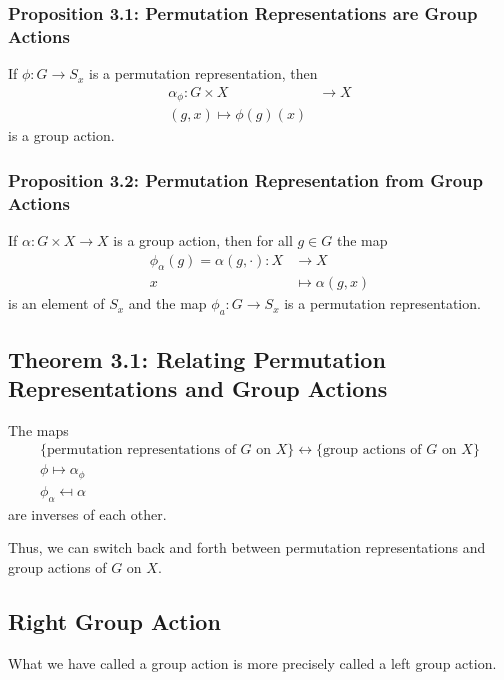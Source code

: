 \documentclass{article}
\begin{document}
\subsubsection{Proposition 3.1: Permutation Representations are Group Actions}
\begin{idea}
    If $\phi:G\rightarrow S_x$ is a permutation representation, then
    \begin{align*}
        \alpha_\phi:G\times X &\rightarrow X \\ 
        (g,x) \mapsto \phi(g)(x)
    \end{align*}
    is a group action.
\end{idea}
\subsubsection{Proposition 3.2: Permutation Representation from Group Actions}
\begin{idea}
    If $\alpha:G\times X \rightarrow X$ is a group action, then for all $g\in G$ the map
    \begin{align*}
        \phi_\alpha(g) = \alpha(g,\cdot): X&\rightarrow X \\
        x &\mapsto \alpha(g,x)
    \end{align*}
    is an element of $S_x$ and the map $\phi_a:G\rightarrow S_x$ is a permutation representation.
\end{idea}
\subsection{Theorem 3.1: Relating Permutation Representations and Group Actions}
\begin{idea}
    The maps 
    \begin{align*}
        \{\text{permutation representations of $G$ on $X$}\} \leftrightarrow \{\text{group actions of $G$ on $X$}\} \\ 
        \phi \mapsto \alpha_\phi \\ 
        \phi_\alpha \mapsfrom \alpha
    \end{align*}
    are inverses of each other.
\end{idea}
Thus, we can switch back and forth between permutation representations and group actions of $G$ on $X$.
\subsection{Right Group Action}
What we have called a group action is more precisely called a left group action.
\end{document}
